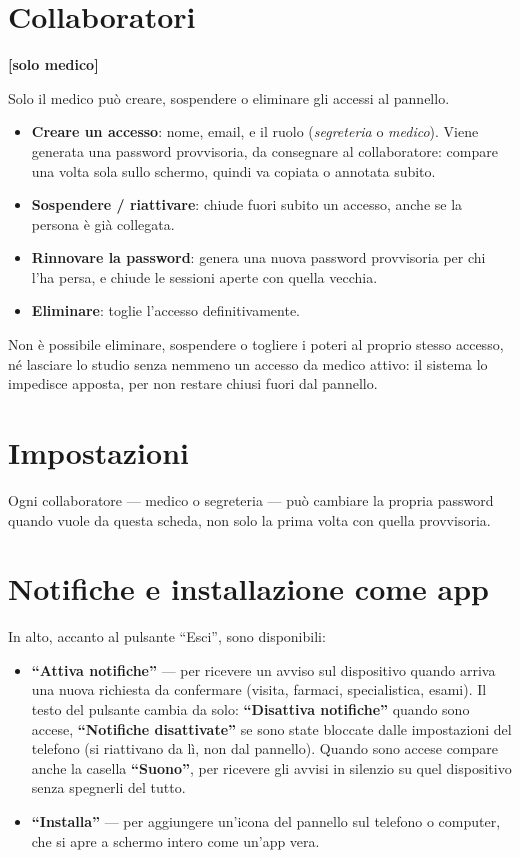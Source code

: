 \documentclass[11pt,a4paper]{article}
\newcommand{\bottone}[1]{\textbf{``#1''}}
\newcommand{\solomedico}{\textcolor{studioarancio}{\textbf{[solo medico]}}\ }
\begin{document}
\section{Collaboratori} \solomedico

Solo il medico può creare, sospendere o eliminare gli accessi al pannello.

\begin{itemize}
  \item \textbf{Creare un accesso}: nome, email, e il ruolo (\emph{segreteria} o \emph{medico}). Viene generata una password provvisoria, da consegnare al collaboratore: compare una volta sola sullo schermo, quindi va copiata o annotata subito.
  \item \textbf{Sospendere / riattivare}: chiude fuori subito un accesso, anche se la persona è già collegata.
  \item \textbf{Rinnovare la password}: genera una nuova password provvisoria per chi l'ha persa, e chiude le sessioni aperte con quella vecchia.
  \item \textbf{Eliminare}: toglie l'accesso definitivamente.
\end{itemize}

Non è possibile eliminare, sospendere o togliere i poteri al proprio stesso accesso, né lasciare lo studio senza nemmeno un accesso da medico attivo: il sistema lo impedisce apposta, per non restare chiusi fuori dal pannello.

\section{Impostazioni}

Ogni collaboratore --- medico o segreteria --- può cambiare la propria password quando vuole da questa scheda, non solo la prima volta con quella provvisoria.

\section{Notifiche e installazione come app}

In alto, accanto al pulsante ``Esci'', sono disponibili:

\begin{itemize}
  \item \bottone{Attiva notifiche} --- per ricevere un avviso sul dispositivo quando arriva una nuova richiesta da confermare (visita, farmaci, specialistica, esami). Il testo del pulsante cambia da solo: \bottone{Disattiva notifiche} quando sono accese, \bottone{Notifiche disattivate} se sono state bloccate dalle impostazioni del telefono (si riattivano da lì, non dal pannello). Quando sono accese compare anche la casella \bottone{Suono}, per ricevere gli avvisi in silenzio su quel dispositivo senza spegnerli del tutto.
  \item \bottone{Installa} --- per aggiungere un'icona del pannello sul telefono o computer, che si apre a schermo intero come un'app vera.
\end{itemize}
\end{document}
